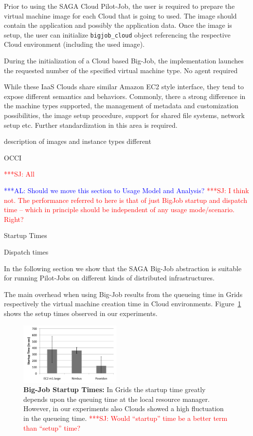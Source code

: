 \documentclass[conference,final]{IEEEtran}
\newcommand{\alnote}[1]{ {\textcolor{blue} { ***AL: #1 }}}
\newcommand{\jhanote}[1]{ {\textcolor{red} { ***SJ: #1 }}}
\newcommand{\alnote}[1]{}
\newcommand{\jhanote}[1]{}
\begin{document}
Prior to using the SAGA Cloud Pilot-Job, the user is required to
prepare the virtual machine image for each Cloud that is going to
used. The image should contain the application and possibly the
application data. Once the image is setup, the user can initialize
\texttt{bigjob\_cloud} object referencing the respective Cloud
environment (including the used image).

During the initialization of a Cloud based Big-Job, the implementation
launches the requested number of the specified virtual machine type.
No agent required

While these IaaS Clouds share similar Amazon EC2 style interface, they
tend to expose different semantics and behaviors. Commonly, there a
strong difference in the machine types supported, the management of
metadata and customization possibilities, the image setup procedure,
support for shared file systems, network setup etc. Further
standardization in this area is required.


description of images and instance types different

OCCI

 \jhanote{All}

\alnote{Should we move this section to Usage Model and Analysis?}
\jhanote{I think not. The performance referred to here is that of just
  BigJob startup and dispatch time -- which in principle should be
  independent of any usage mode/scenario. Right?}

Startup Times

Dispatch times

In the following section we show that the SAGA Big-Job abstraction is
suitable for running Pilot-Jobs on different kinds of distributed
infrastructures.

The main overhead when using Big-Job results from the queueing time in Grids respectively the virtual 
machine creation time in Cloud environments. Figure~\ref{fig:performance_setup_time} shows the setup
times observed in our experiments. 
\begin{figure}[htbp]
    \centering
        \includegraphics[width=0.45\textwidth]{performance/setup_time_xls.pdf}
    \caption{\textbf{Big-Job Startup Times:} In Grids the startup time
      greatly depends upon the queuing time at the local resource
      manager. However, in our experiments also Clouds showed a high
      fluctuation in the queueing time. \jhanote{Would ``startup''
        time be a better term than ``setup'' time?}}
    \label{fig:performance_setup_time}
\end{figure}
\end{document}
